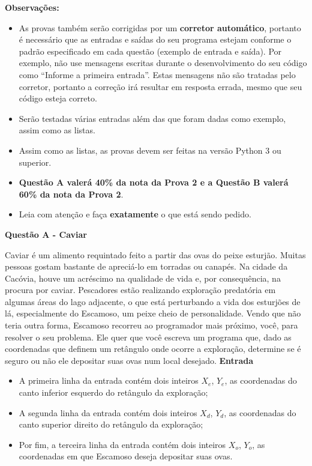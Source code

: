 \documentclass[a4paper, 12pt]{article}
\begin{document}
\textbf{{\large Observações:}}
\begin{itemize}
	\item As provas também serão corrigidas por um \textbf{corretor automático}, portanto é necessário que as entradas e saídas do seu programa estejam conforme o padrão especificado em cada questão (exemplo de entrada e saída). Por exemplo, não use mensagens escritas durante o desenvolvimento do seu código como “Informe a primeira entrada”. Estas mensagens não são tratadas pelo corretor, portanto a correção irá resultar em resposta errada, mesmo que seu código esteja correto.
	\item Serão testadas várias entradas além das que foram dadas como exemplo, assim como as listas.
	\item Assim como as listas, as provas devem ser feitas na versão Python 3 ou superior.
	\item \textbf{Questão A valerá 40\% da nota da Prova 2 e a Questão B valerá 60\% da nota da Prova 2}.
	\item Leia com atenção e faça \textbf{exatamente} o que está sendo pedido.
\end{itemize}
\newpage %
\begin{center}
\textbf{{\Large Questão A - Caviar}}
\end{center}
\vspace{5pt}
Caviar é um alimento requintado feito a partir das ovas do peixe esturjão.
Muitas pessoas gostam bastante de apreciá-lo em torradas ou canapés. Na cidade da Cacóvia, houve um acréscimo na qualidade de vida e, por consequência, na procura por caviar. \newline \newline
Pescadores estão realizando exploração predatória em algumas áreas do
lago adjacente, o que está perturbando a vida dos esturjões de lá,
especialmente do Escamoso, um peixe cheio de personalidade. \newline \newline
Vendo que não teria outra forma, Escamoso recorreu ao programador mais
próximo, você, para resolver o seu problema. Ele quer que você escreva um
programa que, dado as coordenadas que definem um retângulo onde ocorre
a exploração, determine se é seguro ou não ele depositar suas ovas num
local desejado. \newline \newline
\textbf{{\large Entrada}}
\begin{itemize}
\item A primeira linha da entrada contém dois inteiros $X_e$, $Y_e$, as coordenadas do
canto inferior esquerdo do retângulo da exploração;
\item A segunda linha da entrada contém dois inteiros $X_d$, $Y_d$, as coordenadas do
canto superior direito do retângulo da exploração;
\item Por fim, a terceira linha da entrada contém dois inteiros $X_o$, $Y_o$, as
coordenadas em que Escamoso deseja depositar suas ovas.
\end{itemize}
\end{document}
